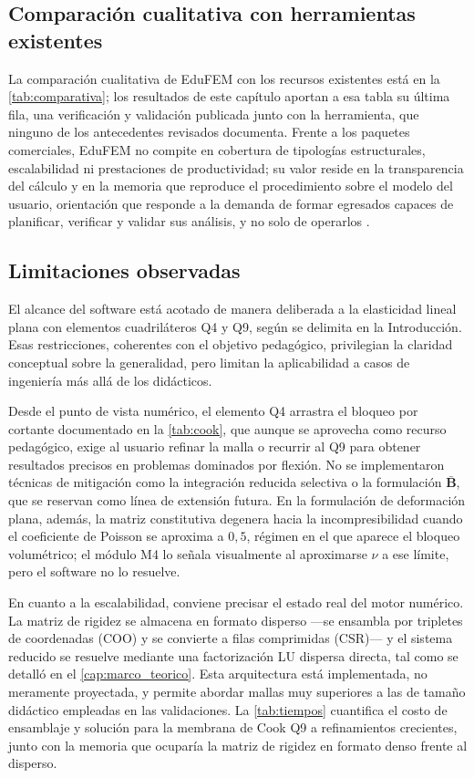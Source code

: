 \subsection{Comparación cualitativa con herramientas existentes}

La comparación cualitativa de EduFEM con los recursos existentes está en la \autoref{tab:comparativa}; los resultados de este capítulo aportan a esa tabla su última fila, una verificación y validación publicada junto con la herramienta, que ninguno de los antecedentes revisados documenta. Frente a los paquetes comerciales, EduFEM no compite en cobertura de tipologías estructurales, escalabilidad ni prestaciones de productividad; su valor reside en la transparencia del cálculo y en la memoria que reproduce el procedimiento sobre el modelo del usuario, orientación que responde a la demanda de formar egresados capaces de planificar, verificar y validar sus análisis, y no solo de operarlos \autocite[pp.~1159, 1168]{perezsantiago2023fem}.

\subsection{Limitaciones observadas}

El alcance del software está acotado de manera deliberada a la elasticidad lineal plana con elementos cuadriláteros Q4 y Q9, según se delimita en la Introducción. Esas restricciones, coherentes con el objetivo pedagógico, privilegian la claridad conceptual sobre la generalidad, pero limitan la aplicabilidad a casos de ingeniería más allá de los didácticos.

Desde el punto de vista numérico, el elemento Q4 arrastra el bloqueo por cortante documentado en la \autoref{tab:cook}, que aunque se aprovecha como recurso pedagógico, exige al usuario refinar la malla o recurrir al Q9 para obtener resultados precisos en problemas dominados por flexión. No se implementaron técnicas de mitigación como la integración reducida selectiva o la formulación $\bar{\bm{B}}$, que se reservan como línea de extensión futura. En la formulación de deformación plana, además, la matriz constitutiva degenera hacia la incompresibilidad cuando el coeficiente de Poisson se aproxima a $0{,}5$, régimen en el que aparece el bloqueo volumétrico; el módulo M4 lo señala visualmente al aproximarse $\nu$ a ese límite, pero el software no lo resuelve.

En cuanto a la escalabilidad, conviene precisar el estado real del motor numérico. La matriz de rigidez se almacena en formato disperso ---se ensambla por tripletes de coordenadas (COO) y se convierte a filas comprimidas (CSR)--- y el sistema reducido se resuelve mediante una factorización LU dispersa directa, tal como se detalló en el \autoref{cap:marco_teorico}. Esta arquitectura está implementada, no meramente proyectada, y permite abordar mallas muy superiores a las de tamaño didáctico empleadas en las validaciones. La \autoref{tab:tiempos} cuantifica el costo de ensamblaje y solución para la membrana de Cook Q9 a refinamientos crecientes, junto con la memoria que ocuparía la matriz de rigidez en formato denso frente al disperso.

